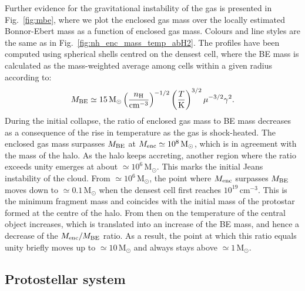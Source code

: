 \documentclass[useAMS,usenatbib]{mnras}
\newcommand{\cmmm}{\text{cm}^{-3}}
\newcommand{\nh}{n_{\rm H}}
\newcommand{\msun}{\text{M}_\odot}
\newcommand{\mbe}{M_{\rm BE}}
\newcommand{\menc}{M_{\rm enc}}
\begin{document}
Further evidence for the gravitational instability of the gas is presented in Fig.~\ref{fig:mbe}, where we plot the enclosed gas mass over the locally estimated Bonnor-Ebert \citep[BE;][]{Ebert_1955, Bonnor_1956} mass as a function of enclosed gas mass. Colours and line styles are the same as in Fig.~\ref{fig:nh_enc_mass_temp_abH2}. The profiles have been computed using spherical shells centred on the densest cell, where the BE mass is calculated as the mass-weighted average among cells within a given radius according to:
\begin{equation}
\mbe \simeq 15\,\msun\left( {\nh \over \cmmm} \right)^{-1/2}\left({ T \over {\rm K}}\right)^{3/2} \mu^{-3/2}\gamma^2.
\label{eq:mbe}
\end{equation}
During the initial collapse, the ratio of enclosed gas mass to BE mass decreases as a consequence of the rise in temperature as the gas is shock-heated. The enclosed gas mass surpasses $\mbe$ at $\menc \simeq 10^8\,\msun$, which is in agreement with the mass of the halo. As the halo keeps accreting, another region where the ratio exceeds unity emerges at about $\simeq 10^6\,\msun$. This marks the initial Jeans instability of the cloud. From $\simeq 10^6\,\msun$, the point where $\menc$ surpasses $\mbe$ moves down to $\simeq 0.1\,\msun$ when the densest cell first reaches $10^{19}\,\cmmm$. This is the minimum fragment mass and coincides with the initial mass of the protostar formed at the centre of the halo. From then on the temperature of the central object increases, which is translated into an increase of the BE mass, and hence a decrease of the $\menc/\mbe$ ratio. As a result, the point at which this ratio equals unity briefly moves up to $\simeq 10\,\msun$ and always stays above $\simeq 1\,\msun$.

\subsection{Protostellar system}
\label{subsec:protosystem}
\end{document}
